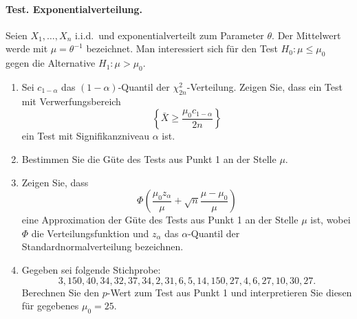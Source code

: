 \paragraph{Test. Exponentialverteilung. } Seien $X_1,\ldots,X_n$ i.i.d.\ und exponentialverteilt
zum Parameter $\theta$. Der Mittelwert werde mit $\mu=\theta^{-1}$ bezeichnet.
Man interessiert sich für den Test $H_0 : \mu \leq \mu_0$ gegen die Alternative $H_1 : \mu > \mu_0$.
\begin{enumerate}
    \item Sei $c_{1-\alpha}$ das $(1-\alpha)$-Quantil der $\chi^2_{2n}$-Verteilung. Zeigen Sie, dass
        ein Test mit Verwerfungsbereich
        \begin{equation}
            \left\{ \bar X \geq \frac{\mu_0 c_{1-\alpha}}{2n} \right\}
        \end{equation}
        ein Test mit Signifikanzniveau $\alpha$ ist.
    \item Bestimmen Sie die Güte des Tests aus Punkt 1 an der Stelle $\mu$.
    \item Zeigen Sie, dass 
        \begin{equation}
            \Phi\left( \frac{\mu_0 z_\alpha}{\mu} + \sqrt{n} \frac{\mu-\mu_0}{\mu} \right) 
        \end{equation}
        eine Approximation der Güte des Tests aus Punkt 1 an der Stelle $\mu$ ist, wobei $\Phi$ die
        Verteilungsfunktion und $z_\alpha$ das $\alpha$-Quantil der Standardnormalverteilung bezeichnen.
    \item Gegeben sei folgende Stichprobe:
        \begin{equation}
            3,150,40,34,32,37,34,2,31,6,5,14,150,27,4,6,27,10,30,27.
        \end{equation}
        Berechnen Sie den $p$-Wert zum Test aus Punkt 1 und interpretieren Sie diesen für gegebenes $\mu_0=25$.
\end{enumerate}

